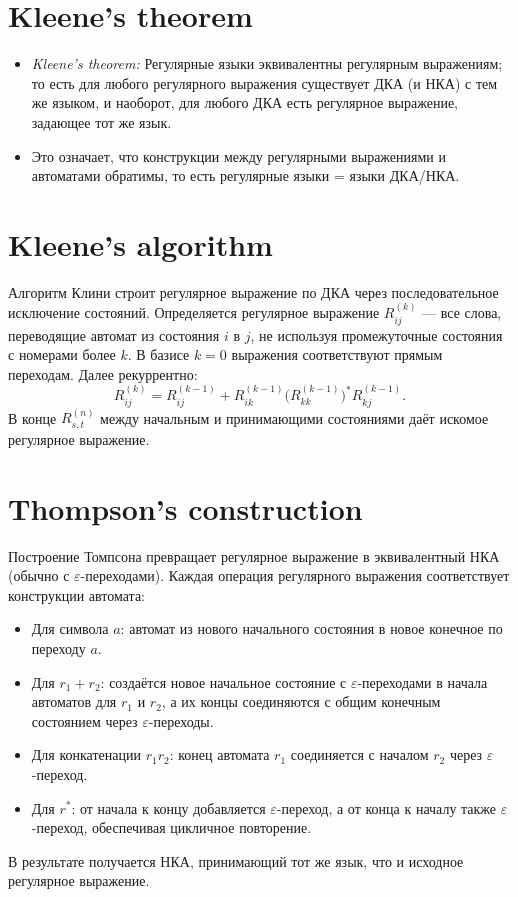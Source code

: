 \documentclass{article}
\begin{document}
	\section{Kleene’s theorem}
	\begin{itemize}
		\item \textit{Kleene’s theorem:} Регулярные языки эквивалентны регулярным выражениям; то есть для любого регулярного выражения существует ДКА (и НКА) с тем же языком, и наоборот, для любого ДКА есть регулярное выражение, задающее тот же язык.
		\item Это означает, что конструкции между регулярными выражениями и автоматами обратимы, то есть регулярные языки = языки ДКА/НКА.
	\end{itemize}
	
	\section{Kleene’s algorithm}
	Алгоритм Клини строит регулярное выражение по ДКА через последовательное исключение состояний. Определяется регулярное выражение $R_{ij}^{(k)}$ --- все слова, переводящие автомат из состояния $i$ в $j$, не используя промежуточные состояния с номерами более $k$. В базисе $k=0$ выражения соответствуют прямым переходам. Далее рекуррентно:
	\[
	R_{ij}^{(k)} = R_{ij}^{(k-1)} + R_{ik}^{(k-1)} \bigl(R_{kk}^{(k-1)}\bigr)^* R_{kj}^{(k-1)}.
	\]
	В конце $R_{s,t}^{(n)}$ между начальным и принимающими состояниями даёт искомое регулярное выражение.
	
	\section{Thompson’s construction}
	Построение Томпсона превращает регулярное выражение в эквивалентный НКА (обычно с $\varepsilon$-переходами). Каждая операция регулярного выражения соответствует конструкции автомата:
	\begin{itemize}
		\item Для символа $a$: автомат из нового начального состояния в новое конечное по переходу $a$.
		\item Для $r_1 + r_2$: создаётся новое начальное состояние с $\varepsilon$-переходами в начала автоматов для $r_1$ и $r_2$, а их концы соединяются с общим конечным состоянием через $\varepsilon$-переходы.
		\item Для конкатенации $r_1 r_2$: конец автомата $r_1$ соединяется с началом $r_2$ через $\varepsilon$-переход.
		\item Для $r^*$: от начала к концу добавляется $\varepsilon$-переход, а от конца к началу также $\varepsilon$-переход, обеспечивая цикличное повторение.
	\end{itemize}
	В результате получается НКА, принимающий тот же язык, что и исходное регулярное выражение.
	
\end{document}
